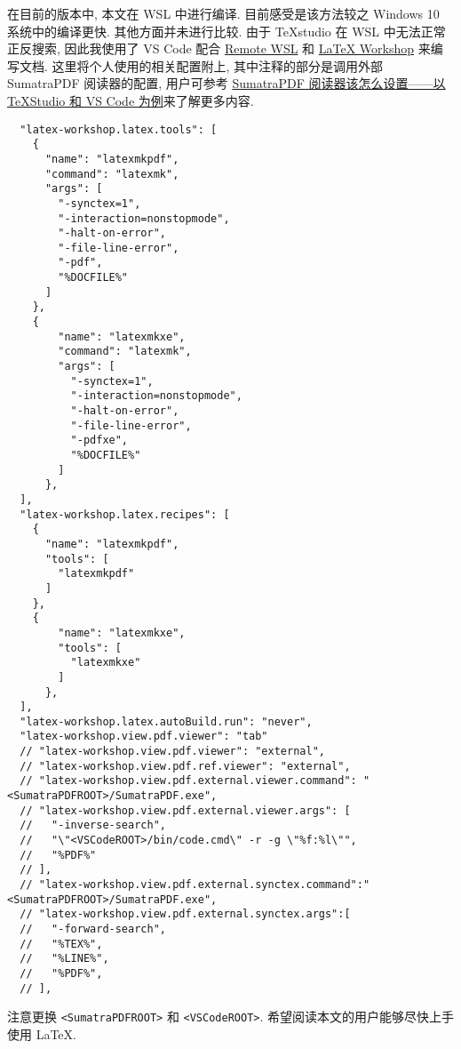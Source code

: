 在目前的版本中, 本文在 WSL 中进行编译.
目前感受是该方法较之 Windows 10 系统中的编译更快.
其他方面并未进行比较.
由于 \TeX studio 在 WSL 中无法正常正反搜索,
因此我使用了 VS Code 配合
\href{https://marketplace.visualstudio.com/items?itemName=ms-vscode-remote.remote-wsl}{Remote WSL}
和
\href{https://marketplace.visualstudio.com/items?itemName=James-Yu.latex-workshop}{\LaTeX{} Workshop}
来编写文档.
这里将个人使用的相关配置附上,
其中注释的部分是调用外部 SumatraPDF 阅读器的配置,
用户可参考 \href{https://wenda.latexstudio.net/article-5055.html}{SumatraPDF 阅读器该怎么设置——以 TeXStudio 和 VS Code 为例}来了解更多内容.
\begin{lstlisting}
  "latex-workshop.latex.tools": [
    {
      "name": "latexmkpdf",
      "command": "latexmk",
      "args": [
        "-synctex=1",
        "-interaction=nonstopmode",
        "-halt-on-error",
        "-file-line-error",
        "-pdf",
        "%DOCFILE%"
      ]
    },
    {
        "name": "latexmkxe",
        "command": "latexmk",
        "args": [
          "-synctex=1",
          "-interaction=nonstopmode",
          "-halt-on-error",
          "-file-line-error",
          "-pdfxe",
          "%DOCFILE%"
        ]
      },
  ],
  "latex-workshop.latex.recipes": [
    {
      "name": "latexmkpdf",
      "tools": [
        "latexmkpdf"
      ]
    },
    {
        "name": "latexmkxe",
        "tools": [
          "latexmkxe"
        ]
      },
  ],
  "latex-workshop.latex.autoBuild.run": "never",
  "latex-workshop.view.pdf.viewer": "tab"
  // "latex-workshop.view.pdf.viewer": "external",
  // "latex-workshop.view.pdf.ref.viewer": "external",
  // "latex-workshop.view.pdf.external.viewer.command": "<SumatraPDFROOT>/SumatraPDF.exe",
  // "latex-workshop.view.pdf.external.viewer.args": [
  //   "-inverse-search",
  //   "\"<VSCodeROOT>/bin/code.cmd\" -r -g \"%f:%l\"",
  //   "%PDF%"
  // ],
  // "latex-workshop.view.pdf.external.synctex.command":"<SumatraPDFROOT>/SumatraPDF.exe",
  // "latex-workshop.view.pdf.external.synctex.args":[
  //   "-forward-search",
  //   "%TEX%",
  //   "%LINE%",
  //   "%PDF%",
  // ],
\end{lstlisting}
注意更换 \texttt{<SumatraPDFROOT>} 和 \texttt{<VSCodeROOT>}.
希望阅读本文的用户能够尽快上手使用 \LaTeX.
